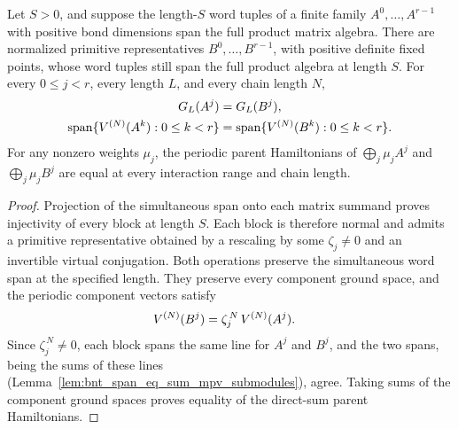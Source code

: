 \begin{lemma}
    \label{thm:block_word_span_primitive_normalization}
    \leanok
    Let $S>0$, and suppose the length-$S$ word tuples of a finite family
    $A^0,\ldots,A^{r-1}$ with positive bond dimensions span the full product
    matrix algebra. There are normalized primitive representatives
    $B^0,\ldots,B^{r-1}$, with positive definite fixed points, whose word tuples
    still span the full product algebra at length $S$.
    For every $0\leq j<r$, every length $L$, and every chain length $N$,
    \begin{align}
        G_L(A^j) & =G_L(B^j),\notag                                      \\
        \operatorname{span}\{V^{(N)}(A^k):0\leq k<r\}
                 & =\operatorname{span}\{V^{(N)}(B^k):0\leq k<r\}.\notag
    \end{align}
    For any nonzero weights $\mu_j$, the periodic parent Hamiltonians
    of $\bigoplus_j\mu_j A^j$ and $\bigoplus_j\mu_j B^j$ are equal at every
    interaction range and chain length.
\end{lemma}
\begin{proof}\leanok
    Projection of the simultaneous span onto each matrix summand proves
    injectivity of every block at length $S$. Each block is therefore normal
    and admits a primitive representative obtained by a rescaling by some
    $\zeta_j\neq0$ and an invertible virtual conjugation. Both operations
    preserve the simultaneous word span at the specified length. They
    preserve every component ground space, and the periodic component
    vectors satisfy
    \begin{align}
        V^{(N)}(B^j) & =\zeta_j^{\,N}\,V^{(N)}(A^j).\notag
    \end{align}
    Since $\zeta_j^{\,N}\neq0$, each block spans the same line for $A^j$ and
    $B^j$, and the two spans, being the sums of these lines
    (Lemma~\ref{lem:bnt_span_eq_sum_mpv_submodules}), agree. Taking sums of the
    component ground spaces proves equality of the direct-sum parent
    Hamiltonians.
\end{proof}

